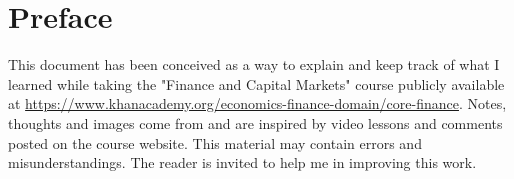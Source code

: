 \chapter*{Preface}
This document has been conceived as a way to explain and keep track of what I learned while taking the "Finance and Capital Markets" course publicly available at \url{https://www.khanacademy.org/economics-finance-domain/core-finance}. Notes, thoughts and images come from and are inspired by video lessons and comments posted on the course website. This material may contain errors and misunderstandings. The reader is invited to help me in improving this work.